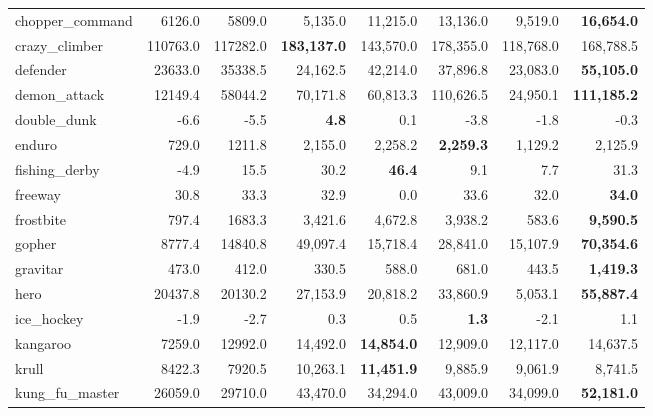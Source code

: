 \documentclass[letterpaper]{article} %
\begin{document}
\begin{table*}[t]
{\begin{tabular}{l|rrrrrrr}
   chopper\_command &    6126.0 &    5809.0 &     5,135.0 &   11,215.0 &       13,136.0 &    9,519.0 &  {\bf  16,654.0 }\\
     crazy\_climber &  110763.0 &  117282.0 &  {\bf  183,137.0} &  143,570.0 &      178,355.0 &  118,768.0 &  168,788.5 \\
          defender &   23633.0 &   35338.5 &    24,162.5 &   42,214.0 &       37,896.8 &   23,083.0 &  {\bf  55,105.0} \\
      demon\_attack &   12149.4 &   58044.2 &    70,171.8 &   60,813.3 &      110,626.5 &   24,950.1 & {\bf  111,185.2} \\
       double\_dunk &      -6.6 &      -5.5 &       {\bf   4.8} &        0.1 &           -3.8 &       -1.8 &       -0.3 \\
            enduro &     729.0 &    1211.8 &     2,155.0 &    2,258.2 &      {\bf   2,259.3 }&    1,129.2 &    2,125.9 \\
     fishing\_derby &      -4.9 &      15.5 &        30.2 &      {\bf  46.4} &            9.1 &        7.7 &       31.3 \\
           freeway &      30.8 &      33.3 &        32.9 &        0.0 &           33.6 &       32.0 &       {\bf 34.0} \\
         frostbite &     797.4 &    1683.3 &     3,421.6 &    4,672.8 &        3,938.2 &      583.6 &   {\bf  9,590.5 }\\
            gopher &    8777.4 &   14840.8 &    49,097.4 &   15,718.4 &       28,841.0 &   15,107.9 &  {\bf  70,354.6} \\
          gravitar &     473.0 &     412.0 &       330.5 &      588.0 &          681.0 &      443.5 &   {\bf  1,419.3} \\
              hero &   20437.8 &   20130.2 &    27,153.9 &   20,818.2 &       33,860.9 &    5,053.1 &  {\bf  55,887.4} \\
        ice\_hockey &      -1.9 &      -2.7 &         0.3 &        0.5 &           {\bf  1.3 }&       -2.1 &        1.1 \\
          kangaroo &    7259.0 &   12992.0 &    14,492.0 &   {\bf 14,854.0 }&       12,909.0 &   12,117.0 &   14,637.5 \\
             krull &    8422.3 &    7920.5 &    10,263.1 &   {\bf 11,451.9} &        9,885.9 &    9,061.9 &    8,741.5 \\
    kung\_fu\_master &   26059.0 &   29710.0 &    43,470.0 &   34,294.0 &       43,009.0 &   34,099.0 &  {\bf  52,181.0 }\\

\end{tabular}}
\end{table*}
\end{document}
